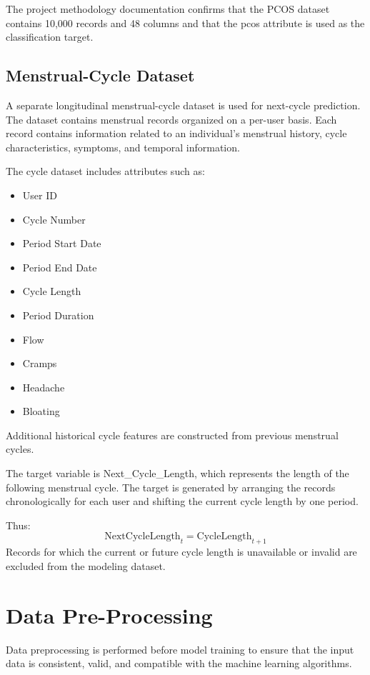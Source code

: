 The project methodology documentation confirms that the PCOS dataset contains 10,000 records and 48 columns and that the pcos attribute is used as the classification target.

\subsection{Menstrual-Cycle Dataset}
A separate longitudinal menstrual-cycle dataset is used for next-cycle prediction. The dataset contains menstrual records organized on a per-user basis. Each record contains information related to an individual's menstrual history, cycle characteristics, symptoms, and temporal information.

The cycle dataset includes attributes such as:
\begin{itemize}
    \item User ID
    \item Cycle Number
    \item Period Start Date
    \item Period End Date
    \item Cycle Length
    \item Period Duration
    \item Flow
    \item Cramps
    \item Headache
    \item Bloating
\end{itemize}
Additional historical cycle features are constructed from previous menstrual cycles.

The target variable is Next\_Cycle\_Length, which represents the length of the following menstrual cycle. The target is generated by arranging the records chronologically for each user and shifting the current cycle length by one period.

Thus:
\begin{equation}
\text{NextCycleLength}_{t} = \text{CycleLength}_{t+1}
\end{equation}
Records for which the current or future cycle length is unavailable or invalid are excluded from the modeling dataset.

\section{Data Pre-Processing}
\label{sec:dataPre}
Data preprocessing is performed before model training to ensure that the input data is consistent, valid, and compatible with the machine learning algorithms.


